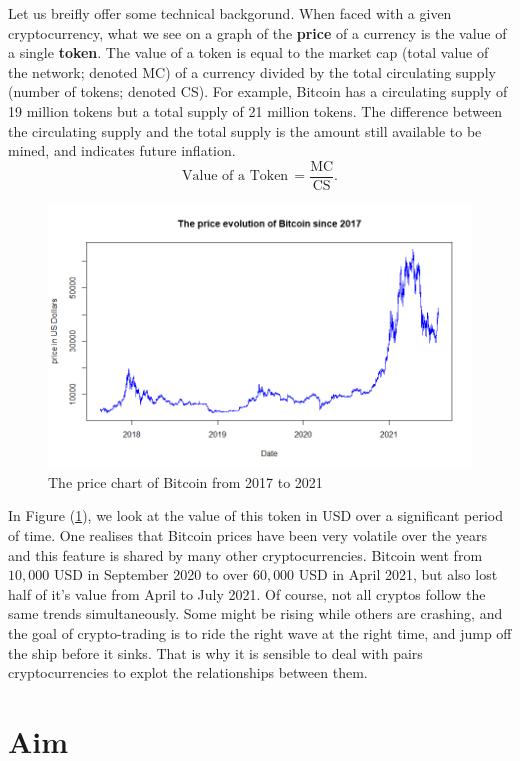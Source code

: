 \documentclass[twoside]{report}
\begin{document}
\begin{spacing}{1}
Let us breifly offer some technical backgorund. When faced with a given cryptocurrency, what we see on a graph of the \textbf{price} of a currency is the value of a single \textbf{token}. The value of a token is equal to the market cap (total value of the network; denoted MC) of a currency divided by the total circulating supply (number of tokens; denoted CS). For example, Bitcoin has a circulating supply of 19 million tokens but a total supply of 21 million tokens. The difference between the circulating supply and the total supply is the amount still available to be mined, and indicates future inflation. 
\[\text{Value of a Token}\, =\frac{\text{MC}}{\text{CS}}.\]
\begin{figure}[!htbp]
    \centering
    \includegraphics[scale = 0.7]{TestPlots/BTC_overview.png}
    \caption{The price chart of Bitcoin from 2017 to 2021}
    \label{BTC overall}
\end{figure}
In Figure (\ref{BTC overall}), we look at the value of this token in USD over a significant period of time. One realises that Bitcoin prices have been very volatile over the years and this feature is shared by many other cryptocurrencies. Bitcoin went from $10,000$ USD in September 2020 to over $60,000$ USD in April 2021, but also lost half of it's value from April to July 2021. Of course, not all cryptos follow the same trends simultaneously. Some might be rising while others are crashing, and the goal of crypto-trading is to ride the right wave at the right time, and jump off the ship before it sinks. That is why it is sensible to deal with pairs cryptocurrencies to explot the relationships between them.\\

\section{Aim}


\end{spacing}
\end{document}
